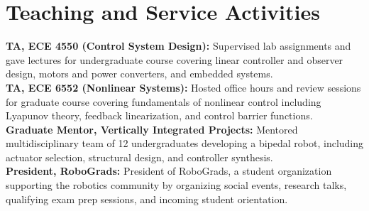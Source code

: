 \documentclass[letterpaper,11pt]{article}
\makeatletter
\newcommand{\resumeItem}[1]{
  \item\small{
    {#1 \vspace{-2pt}}
  }
}
\newcommand{\resumeSubheading}[4]{
  \vspace{-2pt}\item
    \begin{tabular*}{0.97\textwidth}[t]{l@{\extracolsep{\fill}}r}
      \textbf{#1} & #2 \\
      \textit{\small#3} & \textit{\small #4} \\
    \end{tabular*}\vspace{-7pt}
}
\newcommand{\resumeSubHeadingListStart}{\begin{itemize}[leftmargin=0.15in, label={}]}
\newcommand{\resumeSubHeadingListEnd}{\end{itemize}}
\newcommand{\resumeItemListStart}{\begin{itemize}}
\newcommand{\resumeItemListEnd}{\end{itemize}\vspace{-5pt}}
\makeatother
\begin{document}
\section{Teaching and Service Activities}
  \vspace{2pt}
  \resumeSubHeadingListStart
    \small{\item{
        \textbf{TA, ECE 4550 (Control System Design): }{Supervised lab assignments and gave lectures for undergraduate course covering linear controller and observer design, motors and power converters, and embedded systems.} \\ \vspace{3pt}
        \textbf{TA, ECE 6552 (Nonlinear Systems): }{Hosted office hours and review sessions for graduate course covering fundamentals of nonlinear control including Lyapunov theory, feedback linearization, and control barrier functions.} \\ \vspace{3pt}
        \textbf{Graduate Mentor, Vertically Integrated Projects: }{Mentored multidisciplinary team of 12 undergraduates developing a bipedal robot, including actuator selection, structural design, and controller synthesis.} \\ \vspace{3pt}
        \textbf{President, RoboGrads: }{President of RoboGrads, a student organization supporting the robotics community by organizing social events, research talks, qualifying exam prep sessions, and incoming student orientation.}
    }}
  \resumeSubHeadingListEnd



  
    
    
\end{document}
